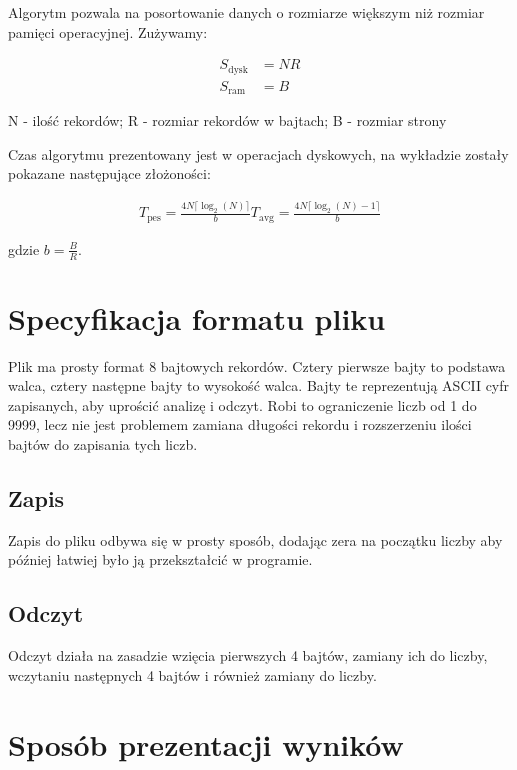 \documentclass[
]{article}
\begin{document}
Algorytm pozwala na posortowanie danych o rozmiarze większym niż rozmiar
pamięci operacyjnej. Zużywamy:

\begin{align}
S_{\text{dysk}} &= NR \\
S_{\text{ram}} &= B
\end{align}

N - ilość rekordów; R - rozmiar rekordów w bajtach; B - rozmiar strony

Czas algorytmu prezentowany jest w operacjach dyskowych, na wykładzie
zostały pokazane następujące złożoności:

\begin{align}
T_{\text{pes}} = \frac{4N\lceil \log_2(N)\rceil}{b}
T_{\text{avg}} = \frac{4N\lceil \log_2(N)-1\rceil}{b}
\end{align}

gdzie \(b = \frac{B}{R}\).

\section{Specyfikacja formatu pliku}\label{specyfikacja-formatu-pliku}

Plik ma prosty format 8 bajtowych rekordów. Cztery pierwsze bajty to
podstawa walca, cztery następne bajty to wysokość walca. Bajty te
reprezentują ASCII cyfr zapisanych, aby uprościć analizę i odczyt. Robi
to ograniczenie liczb od 1 do 9999, lecz nie jest problemem zamiana
długości rekordu i rozszerzeniu ilości bajtów do zapisania tych liczb.

\subsection{Zapis}\label{zapis}

Zapis do pliku odbywa się w prosty sposób, dodając zera na początku
liczby aby później łatwiej było ją przekształcić w programie.

\subsection{Odczyt}\label{odczyt}

Odczyt działa na zasadzie wzięcia pierwszych 4 bajtów, zamiany ich do
liczby, wczytaniu następnych 4 bajtów i również zamiany do liczby.

\section{Sposób prezentacji
wyników}\label{sposuxf3b-prezentacji-wynikuxf3w}
\end{document}

